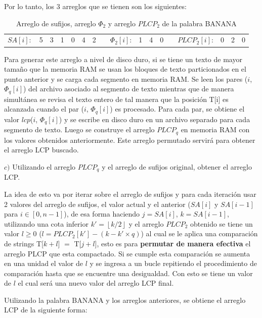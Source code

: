 \newpage

Por lo tanto, los 3 arreglos que se tienen son los siguientes:

\begin{table}[h]
\centering
\begin{tabular}{c|c|c|c|c|c|c|cc|c|c|c|ll|l|l|l|}
\cline{2-7} \cline{10-12} \cline{15-17}
$SA[i]:$ & 5 & 3 & 1 & 0 & 4 & 2 &  & $\Phi_{2}[i]$: & 1 & 4 & 0 &  & $PLCP_{2}[i]$: & 0 & 2 & 0 \\ \cline{2-7} \cline{10-12} \cline{15-17} 
\end{tabular}
\caption{Arreglo de sufijos, arreglo $\Phi_{2}$ y arreglo $PLCP_{2}$ de la palabra BANANA}
\end{table}

Para generar este arreglo a nivel de disco duro, si se tiene un texto de mayor tamaño que la memoria RAM se usan los bloques de texto particionados en el punto anterior y se carga cada segmento en memoria RAM. Se leen los pares ($i$, $\Phi_{q}[i]$) del archivo asociado al segmento de texto mientras que de manera simultánea se revisa el texto entero de tal manera que la posición T[i] es alcanzada cuando el par ($i$, $\Phi_{q}[i]$) es procesado. Para cada par, se obtiene el valor $lcp$($i$, $\Phi_{q}[i]$) y se escribe en disco duro en un archivo separado para cada segmento de texto. Luego se construye el arreglo $PLCP_{q}$ en memoria RAM con los valores obtenidos anteriormente. Este arreglo permutado servirá para obtener el arreglo LCP buscado.

$c)$ Utilizando el arreglo $PLCP_{q}$ y el arreglo de sufijos original, obtener el arreglo LCP.

La idea de esto va por iterar sobre el arreglo de sufijos y para cada iteración usar 2 valores del arreglo de sufijos, el valor actual y el anterior ($SA[i]$ y $SA[i-1]$ para $i \in [0,n-1]$), de esa forma haciendo $j = SA[i]$, $k = SA[i-1]$, utilizando una cota inferior $k' = \left \lfloor{k/2}\right \rfloor$ y el arreglo $PLCP_{2}$ obtenido se tiene un valor $l \geq 0$ ($l=PLCP_{2}[k']-(k-k' \times q)$) al cual se le aplica una comparación de strings T[$k+l$] $=$ T[$j+l$], esto es para \textbf{permutar de manera efectiva} el arreglo PLCP que esta compactado. Si se cumple esta comparación se aumenta en una unidad el valor de $l$ y se ingresa a un bucle repitiendo el procedimiento de comparación hasta que se encuentre una desigualdad. Con esto se tiene un valor de $l$ el cual será una nuevo valor del arreglo LCP final.

Utilizando la palabra BANANA y los arreglos anteriores, se obtiene el arreglo LCP de la siguiente forma:


